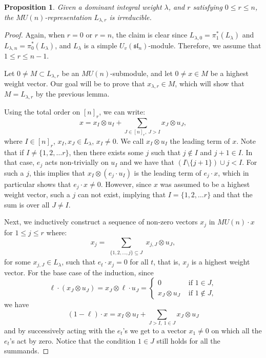 \documentclass{amsart}
\numberwithin{equation}{section}
\theoremstyle{theorem}
\newtheorem{proposition}[theorem]{Proposition}
\theoremstyle{definition}
\newcommand{\sub}{\subseteq}
\newcommand{\sm}{\setminus}
\newcommand{\sll}{\mathfrak{sl}}
\newcommand{\uvsln}{U_v(\sll_n)}
\begin{document}
\begin{proposition} \label{prop:irred}
Given a dominant integral weight $\lambda$, and $r$ satisfying $0\leq r\leq n$, the $MU(n)$-representation $L_{\lambda, r}$ is irreducible.
\end{proposition}

\begin{proof}
Again, when $r=0$ or $r=n$, the claim is clear since $L_{\lambda,0}=\pi_1^*(L_{\lambda})$ and $L_{\lambda,n}=\pi_0^*(L_{\lambda})$, and $L_{\lambda}$ is a simple $\uvsln$-module. Therefore, we assume that $1\leq r\leq n-1$.

Let $0\neq M\subset L_{\lambda,r}$ be an $MU(n)$-submodule, and let $0\neq x\in M$ be a highest weight vector. Our goal will be to prove that $x_{\lambda,r}\in M$, which will show that $M=L_{\lambda,r}$ by the previous lemma. 

Using the total order on $[n]_r$, we can write:
\[x=x_{I}\otimes u_I + \sum_{J\in [n]_r,~ J>I} x_J\otimes u_J,\]
where $I\in [n]_r$, $x_I,x_J\in L_\lambda$, $x_I\neq 0$. We call $x_{I}\otimes u_I$ the leading term of $x$. Note that if $I\not=\{1,2,\dots r\}$, then there exists some $j$ such that $j\not\in I$ and $j+1\in I$. In that case, $e_j$ acts non-trivially on $u_I$ and we have that $(I\sm \{j+1\})\cup{j}<I$. For such a $j$, this implies that $x_I\otimes (e_j\cdot u_I)$ is the leading term of $e_j\cdot x$, which in particular shows that $e_j\cdot x\neq 0$. However, since $x$ was assumed to be a highest weight vector, such a $j$ can not exist, implying that $I=\{1,2,\dots r\}$ and that the sum is over all $J\neq I$.

Next, we inductively construct a sequence of non-zero vectors $x_j$ in $MU(n)\cdot x$ for $1\leq j\leq r$ where:
\[x_j=\sum_{\substack{\{1,2,\dots, j\}\sub J}} x_{j,J}\otimes u_J,\]
for some $x_{j,J}\in L_{\lambda}$, such that $e_t\cdot x_j=0$ for all $t$, that is, $x_j$ is a highest weight vector. For the base case of the induction, since 
\[\ell\cdot(x_J\otimes u_J)=x_J\otimes \ell \cdot u_J=\begin{cases}0 & \text{ if }1\in J,\\ x_J\otimes u_J & \text{ if }1\not\in J,\end{cases}\]
we have
\[(1-\ell)\cdot x=x_I\otimes u_I+\sum_{J>I, ~1\in J}x_J\otimes u_J\] %
and by successively acting with the $e_t$'s we get to a vector $x_1\neq 0$ on which all the $e_t$'s act by zero. Notice that the condition $1\in J$ still holds for all the summands.


\end{proof}
\end{document}
